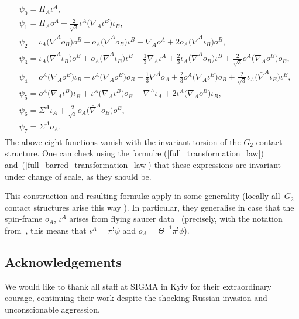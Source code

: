 \documentclass[pdftex]{sigma}%
\numberwithin{equation}{section}
\begin{document}
\begin{gather*}
\begin{split}
&\psi_0 = \Pi_A\iota^A,\\
&\psi_1 = \textstyle
\Pi_Ao^A - \frac{2}{\sqrt{3}}\iota^A\big(\nabla_A\iota^B\big)\iota_B,\\
&\psi_2 = \iota_A\big(\bar{\nabla}^Ao_B\big)o^B + o_A\big(\bar{\nabla}^Ao_B\big)\iota^B
 - \bar{\nabla}_Ao^A + 2o_A\big(\bar{\nabla}^A\iota_B\big)o^B, \\
&\psi_3 = \textstyle\iota_A\big(\bar{\nabla}^A\iota_B\big)o^B
 + o_A\big(\bar{\nabla}^A\iota_B\big)\iota^B - \frac{1}{3}\bar{\nabla}_A\iota^A
 + \frac{2}{3}\iota_A\big(\bar{\nabla}^Ao_B\big)\iota^B
 + \frac{2}{\sqrt{3}}o^A\big(\nabla_Ao^B\big)o_B,\\
&\psi_4 = \textstyle
 o^A\big(\nabla_Ao^B\big)\iota_B + \iota^A\big(\nabla_Ao^B\big)o_B - \frac{1}{3}\nabla^Ao_A
 + \frac{2}{3}o^A\big(\nabla_A\iota^B\big)o_B
 + \frac{2}{\sqrt{3}}\iota_A\big(\bar{\nabla}^A\iota_B\big)\iota^B, \\
&\psi_5 =
 o^A\big(\nabla_A\iota^B\big)\iota_B + \iota^A\big(\nabla_A\iota^B\big)o_B
 - \nabla^A\iota_A + 2\iota^A\big(\nabla_Ao^B\big)\iota_B , \\
&\psi_6 = \textstyle \Sigma^A\iota_A + \frac{2}{\sqrt{3}}o_A\big(\bar{\nabla}^Ao_B\big)o^B,\\
&\psi_7 = \Sigma^Ao_A.
\end{split}
\end{gather*}
The above eight functions vanish with the invariant torsion of the $G_2$
contact structure. One can check using the formul{\ae}
(\ref{full_transformation_law}) and~(\ref{full_barred_transformation_law}) that
these expressions are invariant under change of scale, as they should be.

This construction and resulting formul{\ae} apply in some generality
(locally all~$G_2$ contact structures arise this way \cite{Moy}). In
particular, they generalise \cite[equation~(32)]{EN2} in case that the
spin-frame $o_A$, $\iota^A$ arises from flying saucer
data~\cite[equation~(24)]{EN2} (precisely, with the notation from~\cite{EN2},
this means that $\iota^A=\pi^!\psi$ and $o_A=\Theta^{-1}\pi^!\phi$).

\subsection*{Acknowledgements}

We would like to thank all staff at SIGMA in Kyiv for their extraordinary
courage, continuing their work despite the shocking Russian invasion and
unconscionable aggression.
\end{document}
